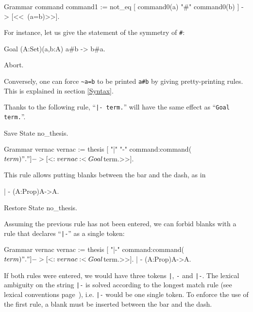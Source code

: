 \begin{coq_example}
Grammar command command1 := 
  not_eq [ command0(a) "#" command0(b) ] -> [<<~(a=b)>>].
\end{coq_example}

For instance, let us give the statement of the symmetry of \verb+#+:

\begin{coq_example}
Goal (A:Set)(a,b:A) a#b -> b#a.
\end{coq_example}

\begin{coq_eval}
Abort.
\end{coq_eval}

Conversely, one can force \verb+~a=b+ to be printed \verb=a#b= by
giving pretty-printing rules. This is explained in section \ref{Syntax}.


Thanks to the following rule, ``{\tt |- term.}'' will have the same
effect as ``{\tt Goal term.}''.

\begin{coq_eval}
Save State no_thesis.
\end{coq_eval}

\begin{coq_example}
Grammar vernac vernac := 
  thesis [ "|" "-" command:command($term) "." ]
          -> [<:vernac:<Goal $term.>>].
\end{coq_example}

\noindent This rule allows putting blanks between the bar and the
dash, as in

\begin{coq_example}
| - (A:Prop)A->A.
\end{coq_example}

\begin{coq_eval}
Restore State no_thesis.
\end{coq_eval}

\noindent Assuming the previous rule has not been entered, we can
forbid blanks with a rule that declares ``\verb+|-+'' as a single
token:

\begin{coq_example}
Grammar vernac vernac := 
  thesis [ "|-" command:command($term) "." ]
          -> [<:vernac:<Goal $term.>>].
| - (A:Prop)A->A.
\end{coq_example}

\noindent If both rules were entered, we would have three tokens
\verb+|+, \verb+-+ and \verb+|-+. The lexical ambiguity on the string
\verb+|-+ is solved according to the longest match rule (see lexical
conventions page~\pageref{lexical}), i.e. \verb+|-+ would be one single
token. To enforce the use of the first rule, a blank must be inserted
between the bar and the dash.


